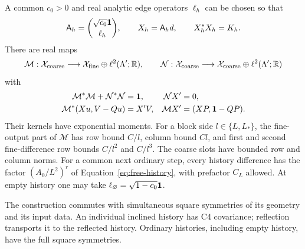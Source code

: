 \begin{proposition}
\label{prop:free-positive}
A common $c_0>0$ and real analytic edge operators $\ell_{h}$
can be chosen so that
\[
 \mathsf A_{h}
   =\binom{\sqrt{c_0}\mathbf 1}{\ell_{h}},
 \qquad X_{h}=\mathsf A_{h}d,
 \qquad X_{h}^*X_{h}=K_{h}.
\]
There are real maps
\[
 \mathcal M:\mathcal X_{\rm coarse}
        \longrightarrow\mathcal X_{\rm fine}\oplus\ell^2(\Lambda';\mathbb R),
 \qquad
 \mathcal N:\mathcal X_{\rm coarse}
        \longrightarrow\mathcal X_{\rm coarse}\oplus\ell^2(\Lambda';\mathbb R)
\]
with
\begin{align}
 \mathcal M^*\mathcal M+\mathcal N^*\mathcal N&=\mathbf 1,
 &\mathcal N X'&=0,\label{eq:free-positive-isometry}\\
 \mathcal M^*(Xu,V-Qu)&=X'V,
 &\mathcal M X'&=(XP,\mathbf 1-QP).
 \label{eq:free-positive-ambient}
\end{align}
Their kernels have exponential moments.  For a block side
$l\in\{L,L_*\}$, the fine-output part of $\mathcal M$ has row bound
$C/l$, column bound $Cl$, and first and second fine-difference row
bounds $C/l^2$ and $C/l^3$.  The coarse slots have bounded row and
column norms.  For a common next ordinary step, every history difference
has the factor $(A_0/L^2)^r$ of Equation~\eqref{eq:free-history},
with prefactor $C_L$ allowed.  At empty history one may take
$\ell_{\varnothing}=\sqrt{1-c_0}\mathbf 1$.

The construction commutes with simultaneous square symmetries of its
geometry and its input data.  An individual inclined history has C4
covariance; reflection transports it to the reflected history.  Ordinary
histories, including empty history, have the full square symmetries.
\end{proposition}

